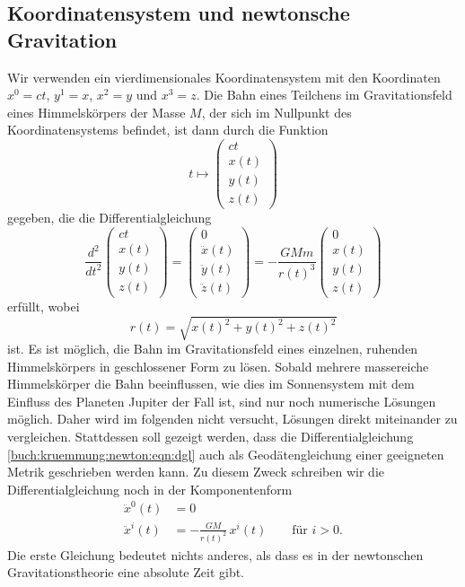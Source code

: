 \subsection{Koordinatensystem und newtonsche Gravitation}
Wir verwenden ein vierdimensionales Koordinatensystem mit
den Koordinaten $x^0=ct$, $y^1=x$, $x^2=y$ und $x^3=z$.
Die Bahn eines Teilchens im Gravitationsfeld eines Himmelskörpers
der Masse $M$, der sich im Nullpunkt des Koordinatensystems befindet,
ist dann durch die Funktion
\[
t\mapsto
\begin{pmatrix}
ct\\
x(t)\\
y(t)\\
z(t)
\end{pmatrix}
\]
gegeben, die die Differentialgleichung
\begin{equation}
\frac{d^2}{dt^2}
\begin{pmatrix}
ct\\
x(t)\\
y(t)\\
z(t)
\end{pmatrix}
=
\begin{pmatrix}
0\\
\ddot{x}(t)\\
\ddot{y}(t)\\
\ddot{z}(t)
\end{pmatrix}
=
-
\frac{GMm}{r(t)^3}
\begin{pmatrix}
0\\
x(t)\\
y(t)\\
z(t)
\end{pmatrix}
\label{buch:kruemmung:newton:eqn:dgl}
\end{equation}
erfüllt, wobei
\[
r(t)
=
\sqrt{x(t)^2 + y(t)^2 + z(t)^2}
\]
ist.
Es ist möglich, die Bahn im Gravitationsfeld eines einzelnen,
ruhenden Himmelskörpers in geschlossener Form zu lösen.
Sobald mehrere massereiche Himmelskörper die Bahn beeinflussen,
wie dies im Sonnensystem mit dem Einfluss des Planeten Jupiter
der Fall ist, sind nur noch numerische Lösungen möglich.
Daher wird im folgenden nicht versucht, Lösungen direkt miteinander
zu vergleichen.
Stattdessen soll gezeigt werden, dass die Differentialgleichung
\eqref{buch:kruemmung:newton:eqn:dgl}
auch als Geodätengleichung einer geeigneten Metrik geschrieben
werden kann.
Zu diesem Zweck schreiben wir die Differentialgleichung noch in
der Komponentenform
\begin{equation}
\begin{aligned}
\ddot{x}^0(t) &= 0 \\
\ddot{x}^i(t) &= - \frac{GM}{r(t)^2}\,x^i(t)\qquad \text{für $i>0$}.
\end{aligned}
\label{buch:kruemmung:newton:eqn:dglcomponents}
\end{equation}
Die erste Gleichung bedeutet nichts anderes, als dass es in der
newtonschen Gravitationstheorie eine absolute Zeit gibt.

